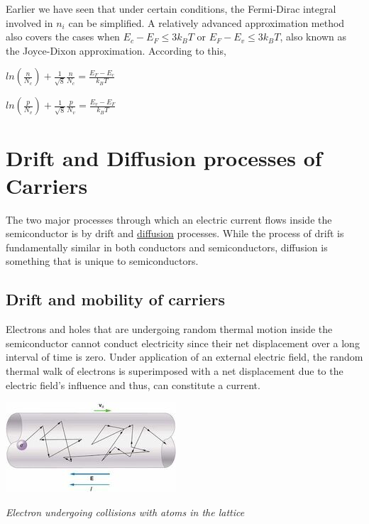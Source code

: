 \documentclass[12 pt]{article}
\begin{document}
Earlier we have seen that under certain conditions, the Fermi-Dirac integral involved in $n_{i}$ can be simplified. A relatively advanced approximation method also covers the cases when $E_{c}-E_{F} \leq 3k_{B}T$ or $E_{F}-E_{v} \leq 3k_{B}T$, also known as the Joyce-Dixon approximation. According to this,
\begin{center}
$ln(\frac{n}{N_{c}}) + \frac{1}{\sqrt{8}}\frac{n}{N_{c}} = \frac{E_{F}-E_{c}}{k_{B}T}$
\end{center}

\begin{center}
 $ln(\frac{p}{N_{v}}) + \frac{1}{\sqrt{8}}\frac{p}{N_{v}} = \frac{E_{v}-E_{F}}{k_{B}T}$   
\end{center}



\section{Drift and Diffusion processes of Carriers}

The two major processes through which an electric current flows inside the semiconductor is by drift and \href{https://en.wikipedia.org/wiki/Diffusion}{diffusion} processes. While the process of drift is fundamentally similar in both conductors and semiconductors, diffusion is something that is unique to semiconductors.

\subsection{Drift and mobility of carriers}

Electrons and holes that are undergoing random thermal motion inside the semiconductor cannot conduct electricity since their net displacement over a long interval of time is zero. Under application of an external electric field, the random thermal walk of electrons is superimposed with a net displacement due to the electric field's influence and thus, can constitute a current. \newline

  \par
   \begin{center}
   \includegraphics{drift_velocity_60.jpg}
   \end{center}
    \begin{center}
      \emph{Electron undergoing collisions with atoms in the lattice}
  \end{center}
\par
\end{document}
